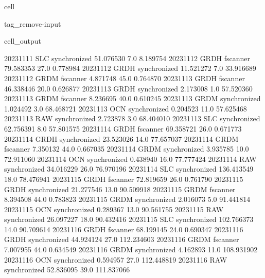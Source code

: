 \documentclass[letterpaper,10pt,english]{jupyterBook}
\begin{document}
\begin{sphinxuseclass}{cell}
\begin{sphinxuseclass}{tag_remove-input}
\begin{sphinxVerbatimOutput}
\begin{sphinxuseclass}{cell_output}
\begin{sphinxVerbatim}[commandchars=\\\{\}]
2023\PYGZhy{}11\PYGZhy{}11          SLC  synchronized   51.076530     7.0    8.189754
2023\PYGZhy{}11\PYGZhy{}12         GRDH      fscanner   79.583353    27.0    0.778984
2023\PYGZhy{}11\PYGZhy{}12         GRDH  synchronized   11.521272     7.0   33.916689
2023\PYGZhy{}11\PYGZhy{}12         GRDM      fscanner    4.871748    45.0    0.764870
2023\PYGZhy{}11\PYGZhy{}13         GRDH      fscanner   46.338446    20.0    0.626877
2023\PYGZhy{}11\PYGZhy{}13         GRDH  synchronized    2.173008     1.0   57.520360
2023\PYGZhy{}11\PYGZhy{}13         GRDM      fscanner    8.236695    40.0    0.610245
2023\PYGZhy{}11\PYGZhy{}13         GRDM  synchronized    1.024492     3.0   68.468721
2023\PYGZhy{}11\PYGZhy{}13          OCN  synchronized    0.204523    11.0   57.625468
2023\PYGZhy{}11\PYGZhy{}13          RAW  synchronized    2.723878     3.0   68.404010
2023\PYGZhy{}11\PYGZhy{}13          SLC  synchronized   62.756391     8.0   57.801575
2023\PYGZhy{}11\PYGZhy{}14         GRDH      fscanner   69.358721    26.0    0.671773
2023\PYGZhy{}11\PYGZhy{}14         GRDH  synchronized   23.523026    14.0   77.657037
2023\PYGZhy{}11\PYGZhy{}14         GRDM      fscanner    7.350132    44.0    0.667035
2023\PYGZhy{}11\PYGZhy{}14         GRDM  synchronized    3.935785    10.0   72.911060
2023\PYGZhy{}11\PYGZhy{}14          OCN  synchronized    0.438940    16.0   77.777424
2023\PYGZhy{}11\PYGZhy{}14          RAW  synchronized   34.016229    26.0   76.970196
2023\PYGZhy{}11\PYGZhy{}14          SLC  synchronized  136.413549    18.0   78.476941
2023\PYGZhy{}11\PYGZhy{}15         GRDH      fscanner   72.819659    26.0    0.761790
2023\PYGZhy{}11\PYGZhy{}15         GRDH  synchronized   21.277546    13.0   90.509918
2023\PYGZhy{}11\PYGZhy{}15         GRDM      fscanner    8.394508    44.0    0.783823
2023\PYGZhy{}11\PYGZhy{}15         GRDM  synchronized    2.016073     5.0   91.441814
2023\PYGZhy{}11\PYGZhy{}15          OCN  synchronized    0.289367    13.0   90.561755
2023\PYGZhy{}11\PYGZhy{}15          RAW  synchronized   26.097227    18.0   90.432416
2023\PYGZhy{}11\PYGZhy{}15          SLC  synchronized  102.766373    14.0   90.709614
2023\PYGZhy{}11\PYGZhy{}16         GRDH      fscanner   68.199145    24.0    0.690347
2023\PYGZhy{}11\PYGZhy{}16         GRDH  synchronized   44.924124    27.0  112.234603
2023\PYGZhy{}11\PYGZhy{}16         GRDM      fscanner    7.007955    44.0    0.634549
2023\PYGZhy{}11\PYGZhy{}16         GRDM  synchronized    4.162893    11.0  108.931902
2023\PYGZhy{}11\PYGZhy{}16          OCN  synchronized    0.594957    27.0  112.448819
2023\PYGZhy{}11\PYGZhy{}16          RAW  synchronized   52.836095    39.0  111.837066

\end{sphinxVerbatim}
\end{sphinxuseclass}
\end{sphinxVerbatimOutput}
\end{sphinxuseclass}
\end{sphinxuseclass}
\end{document}
